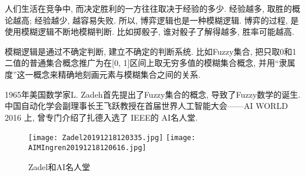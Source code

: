 人们生活在竞争中, 而决定胜利的一方往往取决于经验的多少. 经验越多, 取胜的概论越高; 经验越少, 越容易失败. 所以, 博弈逻辑也是一种模糊逻辑. 博弈的过程, 是使用模糊逻辑不断地模糊判断. 比如掷骰子, 谁对骰子了解得越多, 胜率可能越高.

模糊逻辑是通过不确定判断, 建立不确定的判断系统. 比如Fuzzy集合, 把只取0和1二值的普通集合概念推广为在[0, 1]区间上取无穷多值的模糊集合概念, 并用“隶属度”这一概念来精确地刻画元素与模糊集合之间的关系.

1965年美国数学家L. Zadeh首先提出了Fuzzy集合的概念, 导致了Fuzzy数学的诞生.  中国自动化学会副理事长王飞跃教授在首届世界人工智能大会——AI WORLD 2016 上, 曾专门介绍了扎德入选了 IEEE的 AI名人堂.
\begin{figure}[H]
\centering
\texttt{[image: Zadel20191218120335.jpg]}
\texttt{[image: AIMIngren20191218120616.jpg]}
\caption{Zadel和AI名人堂}
\label{Zadel20191218120335}
\end{figure}
%
%
%
%
%
%
%
